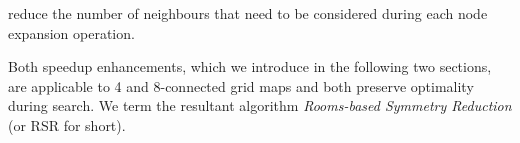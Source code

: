 reduce the number of neighbours that need to be considered during each node 
expansion operation.
\par
Both speedup enhancements, which we introduce in the following two sections, 
are applicable to 4 and 8-connected grid maps and both preserve optimality
during search.
We term the resultant algorithm \emph{Rooms-based Symmetry Reduction} 
(or RSR for short).
